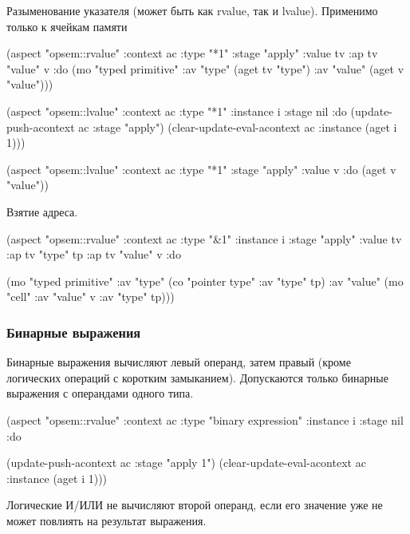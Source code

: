 \documentclass[12pt,twoside,russian]{article}
\newcommand{\textABMLString}[1]{{\color{abmlString}#1}}
\newcommand{\ABMLString}[1]{\abmlinline{\textABMLString{#1}}}
\begin{document}
Разыменование указателя (может быть как rvalue, так и lvalue). Применимо только к ячейкам памяти \ABMLString{cell}

\begin{ABMLCode}
(aspect "opsem::rvalue" :context ac :type "*1" :stage "apply" 
  :value tv :ap tv "value" v :do 
  (mo "typed primitive" :av "type" (aget tv "type") 
                        :av "value" (aget v "value")))

(aspect "opsem::lvalue" :context ac :type "*1" :instance i :stage nil 
:do (update-push-acontext ac :stage "apply")
    (clear-update-eval-acontext ac :instance (aget i 1)))

(aspect "opsem::lvalue" :context ac :type "*1" :stage "apply" 
  :value v :do (aget v "value"))
\end{ABMLCode}

Взятие адреса.

\begin{ABMLCode}
(aspect "opsem::rvalue" :context ac :type "&1" :instance i 
  :stage "apply" :value tv :ap tv "type" tp :ap tv "value" v :do 
  
  (mo "typed primitive" :av "type" (co "pointer type" :av "type" tp) 
    :av "value" (mo "cell" :av "value" v :av "type" tp)))
\end{ABMLCode}

\subsubsection{Бинарные выражения}
Бинарные выражения вычисляют левый операнд, затем правый (кроме логических  операций с коротким замыканием). Допускаются только бинарные выражения с операндами одного типа.

\begin{ABMLCode}
(aspect "opsem::rvalue" :context ac :type "binary expression" :instance i 
  :stage nil :do 
  
  (update-push-acontext ac :stage "apply 1")
  (clear-update-eval-acontext ac :instance (aget i 1)))
\end{ABMLCode}

Логические И/ИЛИ не вычисляют второй операнд, если его значение уже не может повлиять на результат выражения.
\end{document}
